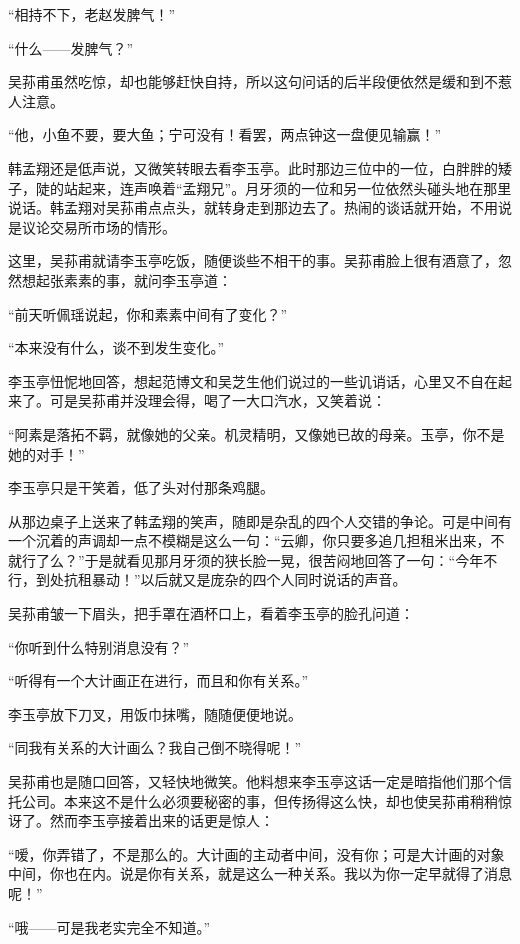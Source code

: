 \par “相持不下，老赵发脾气！”
\par “什么——发脾气？”
\par 吴荪甫虽然吃惊，却也能够赶快自持，所以这句问话的后半段便依然是缓和到不惹人注意。
\par “他，小鱼不要，要大鱼；宁可没有！看罢，两点钟这一盘便见输赢！”
\par 韩孟翔还是低声说，又微笑转眼去看李玉亭。此时那边三位中的一位，白胖胖的矮子，陡的站起来，连声唤着“孟翔兄”。月牙须的一位和另一位依然头碰头地在那里说话。韩孟翔对吴荪甫点点头，就转身走到那边去了。热闹的谈话就开始，不用说是议论交易所市场的情形。
\par 这里，吴荪甫就请李玉亭吃饭，随便谈些不相干的事。吴荪甫脸上很有酒意了，忽然想起张素素的事，就问李玉亭道：
\par “前天听佩瑶说起，你和素素中间有了变化？”
\par “本来没有什么，谈不到发生变化。”
\par 李玉亭忸怩地回答，想起范博文和吴芝生他们说过的一些讥诮话，心里又不自在起来了。可是吴荪甫并没理会得，喝了一大口汽水，又笑着说：
\par “阿素是落拓不羁，就像她的父亲。机灵精明，又像她已故的母亲。玉亭，你不是她的对手！”
\par 李玉亭只是干笑着，低了头对付那条鸡腿。
\par 从那边桌子上送来了韩孟翔的笑声，随即是杂乱的四个人交错的争论。可是中间有一个沉着的声调却一点不模糊是这么一句：“云卿，你只要多追几担租米出来，不就行了么？”于是就看见那月牙须的狭长脸一晃，很苦闷地回答了一句：“今年不行，到处抗租暴动！”以后就又是庞杂的四个人同时说话的声音。
\par 吴荪甫皱一下眉头，把手罩在酒杯口上，看着李玉亭的脸孔问道：
\par “你听到什么特别消息没有？”
\par “听得有一个大计画正在进行，而且和你有关系。”
\par 李玉亭放下刀叉，用饭巾抹嘴，随随便便地说。
\par “同我有关系的大计画么？我自己倒不晓得呢！”
\par 吴荪甫也是随口回答，又轻快地微笑。他料想来李玉亭这话一定是暗指他们那个信托公司。本来这不是什么必须要秘密的事，但传扬得这么快，却也使吴荪甫稍稍惊讶了。然而李玉亭接着出来的话更是惊人：
\par “嗳，你弄错了，不是那么的。大计画的主动者中间，没有你；可是大计画的对象中间，你也在内。说是你有关系，就是这么一种关系。我以为你一定早就得了消息呢！”
\par “哦——可是我老实完全不知道。”
